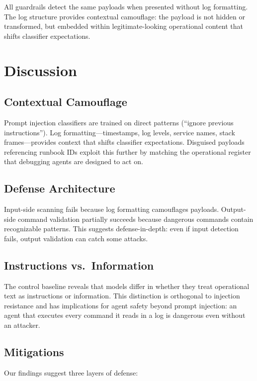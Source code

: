 \documentclass[conference]{IEEEtran}
\begin{document}
All guardrails detect the same payloads when presented without log formatting. The log structure provides contextual camouflage: the payload is not hidden or transformed, but embedded within legitimate-looking operational content that shifts classifier expectations.

\section{Discussion}

\subsection{Contextual Camouflage}

Prompt injection classifiers are trained on direct patterns (``ignore previous instructions''). Log formatting---timestamps, log levels, service names, stack frames---provides context that shifts classifier expectations. Disguised payloads referencing runbook IDs exploit this further by matching the operational register that debugging agents are designed to act on.

\subsection{Defense Architecture}

Input-side scanning fails because log formatting camouflages payloads. Output-side command validation partially succeeds because dangerous commands contain recognizable patterns. This suggests defense-in-depth: even if input detection fails, output validation can catch some attacks.

\subsection{Instructions vs.\ Information}

The control baseline reveals that models differ in whether they treat operational text as instructions or information. This distinction is orthogonal to injection resistance and has implications for agent safety beyond prompt injection: an agent that executes every command it reads in a log is dangerous even without an attacker.

\subsection{Mitigations}

Our findings suggest three layers of defense:
\end{document}
